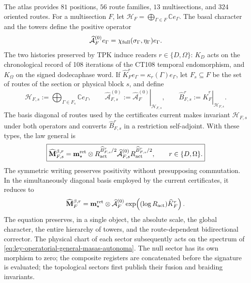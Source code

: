 The atlas provides \(81\) positions, \(56\) route families, \(13\)
multisections, and \(324\) oriented routes. For a multisection \(F\), let
\(\mathcal H_F=\bigoplus_{\Gamma\in F}\mathbb C e_\Gamma\). The basal character
and the towers define the positive operator
\begin{equation}
 \widehat{\mathcal A}^{(0)}_F e_\Gamma
 =\chi_{\rm full}(\sigma_\Gamma,\eta_\Gamma)e_\Gamma.
 \label{eq:operador-caracter-basal-masas-autonoma}
\end{equation}
The two histories preserved by TPK induce readers
\(r\in\{D,\Omega\}\): \(K_D\) acts on the chronological record of
108 iterations of the CT108 temporal endomorphism, and \(K_\Omega\) on the signed
dodecaphase word. If
\(\widehat K_F^r e_\Gamma=\kappa_r(\Gamma)e_\Gamma\), let
\(F_s\subseteq F\) be the set of routes of the section or physical block \(s\), and
define
\begin{equation}
 \mathcal H_{F,s}:=\bigoplus_{\Gamma\in F_s}\mathbb C e_\Gamma,
 \qquad
 \widehat{\mathcal A}^{(0)}_{F,s}
 :=\left.\widehat{\mathcal A}^{(0)}_F\right|_{\mathcal H_{F,s}},
 \qquad
 \widehat B_{F,s}^r
 :=\left.\widehat K_F^r\right|_{\mathcal H_{F,s}}.
 \label{eq:restricciones-bloque-ley-masas-autonoma}
\end{equation}
The basis diagonal of routes used by the certificates current makes invariant
\(\mathcal H_{F,s}\) under both operators and converts
\(\widehat B_{F,s}^r\) in a restriction self-adjoint. With these types, the law
general is
\begin{equation}
 \boxed{
 \widehat{\mathbf M}^{\beta,r}_{F,s}
 =\mathbf m_\star^{\rm ret}\otimes
  R_{\rm act}^{\widehat B_{F,s}^r/2}
  \widehat{\mathcal A}^{(0)}_{F,s}
  R_{\rm act}^{\widehat B_{F,s}^r/2},
 \qquad r\in\{D,\Omega\}.}
 \label{eq:ley-operatorial-general-masas-autonoma}
\end{equation}
The symmetric writing preserves positivity without presupposing commutation. In the
simultaneously diagonal basis employed by the
current certificates, it reduces to
\begin{equation}
 \widehat{\mathbf M}^{\beta,r}_F
 =\mathbf m_\star^{\rm ret}\otimes
  \widehat{\mathcal A}^{(0)}_F
  \exp\!\left((\log R_{\rm act})\widehat K_F^r\right).
 \label{eq:ley-operatorial-diagonal-masas-autonoma}
\end{equation}
The equation preserves, in a single object, the absolute scale, the global
character, the entire hierarchy of towers, and the route-dependent bidirectional
corrector. The physical chart of each sector subsequently acts on the spectrum of
\eqref{eq:ley-operatorial-general-masas-autonoma}. The null sector has its
own morphism to zero; the composite registers are concatenated before
the signature is evaluated; the topological sectors first publish their fusion
and braiding invariants.

